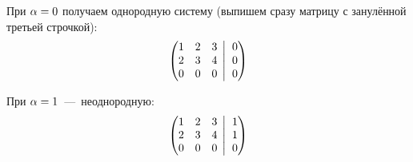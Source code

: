 \documentclass[a4paper,12pt]{article}
\newcommand{\BigMiddleThree}{\;\left|\vphantom{\begin{pmatrix} 0\\0\\0 \end{pmatrix}}\right.\;}
\begin{document}
\begin{solution}
    При $\alpha \hm= 0$ получаем однородную систему (выпишем сразу матрицу с занулённой третьей строчкой):
    \begin{equation}\label{19-19-sys-homo}
      \left(
        \begin{matrix}
          1 & 2 & 3\\
          2 & 3 & 4\\
          0 & 0 & 0
        \end{matrix}
        \BigMiddleThree
        \begin{matrix}
          0\\
          0\\
          0
        \end{matrix}
      \right)
    \end{equation}
    
    При $\alpha \hm= 1$~---~неоднородную:
    \begin{equation}\label{19-19-sys-hetero}
      \left(
        \begin{matrix}
          1 & 2 & 3\\
          2 & 3 & 4\\
          0 & 0 & 0
        \end{matrix}
        \BigMiddleThree
        \begin{matrix}
          1\\
          1\\
          0
        \end{matrix}
      \right)
    \end{equation}


\end{solution}
\end{document}
